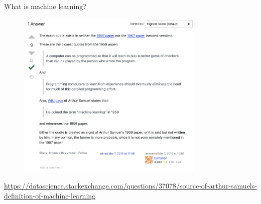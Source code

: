 \documentclass[xcolor={dvipsnames}, handout]{beamer}
\begin{document}



\begin{frame}{What is machine learning?}

\begin{figure}
\centering
\includegraphics[width = 0.8\textwidth]{../assets/samuel-refute-stackexchange.png}
\end{figure}

\url{https://datascience.stackexchange.com/questions/37078/source-of-arthur-samuels-definition-of-machine-learning}

\end{frame}





\end{document}
